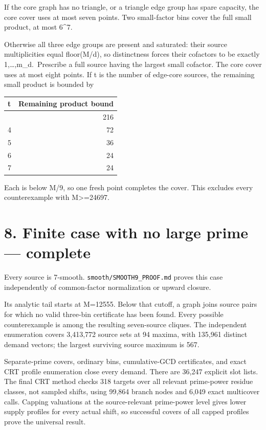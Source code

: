 \documentclass[11pt,a4paper]{article}
\begin{document}
If the core graph has no triangle, or a triangle edge group has spare
capacity, the core cover uses at most seven points. Two small-factor
bins cover the full small product, at most 6\^{}7.

Otherwise all three edge groups are present and saturated: their source
multiplicities equal floor(M/d), so distinctness forces their cofactors
to be exactly 1,\ldots,m\_d.~Prescribe a full source having the largest
small cofactor. The core cover uses at most eight points. If t is the
number of edge-core sources, the remaining small product is bounded by

\begin{longtable}[]{@{}lr@{}}
\toprule\noalign{}
t & Remaining product bound \\
\midrule\noalign{}
\endhead
\bottomrule\noalign{}
\endlastfoot
3 & 216 \\
4 & 72 \\
5 & 36 \\
6 & 24 \\
7 & 24 \\
\end{longtable}

Each is below M/9, so one fresh point completes the cover. This excludes
every counterexample with M\textgreater=24697.

\section{8. Finite case with no large prime ---
complete}\label{finite-case-with-no-large-prime-complete}

Every source is 7-smooth. \nolinkurl{smooth/SMOOTH9_PROOF.md} proves this
case independently of common-factor normalization or upward closure.

Its analytic tail starts at M=12555. Below that cutoff, a graph joins
source pairs for which no valid three-bin certificate has been found.
Every possible counterexample is among the resulting seven-source
cliques. The independent enumeration covers 3,413,772 source sets at 94
maxima, with 135,961 distinct demand vectors; the largest surviving
source maximum is 567.

Separate-prime covers, ordinary bins, cumulative-GCD certificates, and
exact CRT profile enumeration close every demand. There are 36,247
explicit slot lists. The final CRT method checks 318 targets over all
relevant prime-power residue classes, not sampled shifts, using 99,864
branch nodes and 6,049 exact multicover calls. Capping valuations at the
source-relevant prime-power level gives lower supply profiles for every
actual shift, so successful covers of all capped profiles prove the
universal result.
\end{document}
